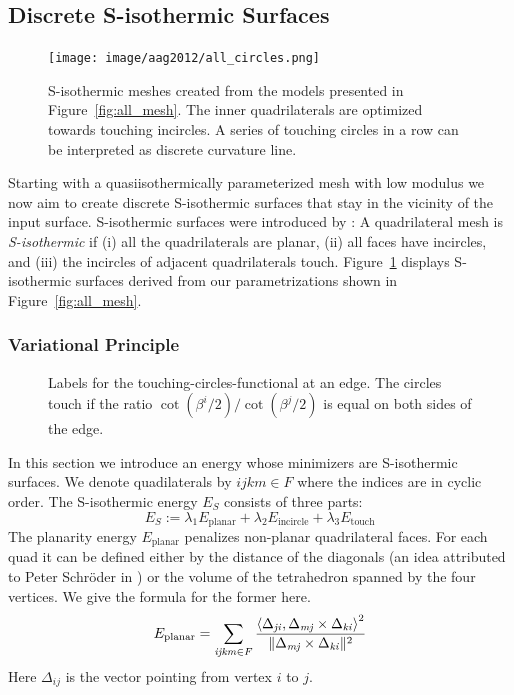 \subsection{Discrete S-isothermic Surfaces}
\label{sec:s-isothermic}

\begin{figure}
\centering
\texttt{[image: image/aag2012/all\_circles.png]}
\caption{S-isothermic meshes created from the models presented in
Figure~\ref{fig:all_mesh}.
The inner quadrilaterals are optimized towards touching incircles. A series of
touching circles in a row can be interpreted as discrete curvature line.}
\label{fig:s_isothermic}
\end{figure}

Starting with a quasiisothermically parameterized mesh with low modulus 
we now aim to create discrete S-isothermic surfaces that
stay in the vicinity of the input surface. S-isothermic surfaces were
introduced by \cite{BobenkoP1996}: A quadrilateral mesh
is \mbox{\emph{S-isothermic}} if (i) all the quadrilaterals are planar, (ii)
all faces have incircles, and (iii) the incircles of adjacent quadrilaterals
touch.
Figure~\ref{fig:s_isothermic} displays S-isothermic surfaces derived from our
parametrizations shown in Figure~\ref{fig:all_mesh}.

\subsubsection{Variational Principle}

\begin{figure}

\centering
\caption{Labels for the touching-circles-functional at an edge. The circles touch 
if the ratio $\cot\left(\beta^i/2\right)/\cot\left(\beta^j/2\right)$ is equal on both sides of the edge.}
\label{fig:functional}
\end{figure}

In this section we introduce an energy whose minimizers are S-isothermic
surfaces. We denote quadilaterals by $ijkm\in F$ where the indices are in 
cyclic order.
The S-isothermic energy $E_S$ consists of three parts:
\begin{equation}
  E_S := 
  \lambda_1 E_{\mathrm{planar}} + 
  \lambda_2 E_{\mathrm{incircle}} + 
  \lambda_3 E_{\mathrm{touch}}
\end{equation}
The planarity energy $E_{\mathrm{planar}}$ penalizes non-planar quadrilateral
faces. For each quad it can be defined either by the distance of the diagonals
(an idea attributed to Peter Schr\"oder in \cite{PottmannSBSWBW2008}) or the
volume of the tetrahedron spanned by the
four vertices. We give the formula for the former here. 
\begin{equation}
E_{\mathrm{planar}} = \sum_{\mathrm{\it{ijkm}} \in F} \frac{\left<\Delta_{\mathrm{\it{ji}}},\Delta_{\mathrm{\it{mj}}} \times \Delta_{\mathrm{\it{ki}}}\right>^2}
{\Vert\Delta_{\mathrm{\it{mj}}} \times \Delta_{\mathrm{\it{ki}}}\Vert^2}
\end{equation}
Here $\Delta_{ij}$ is the vector pointing from vertex $i$ to $j$.


